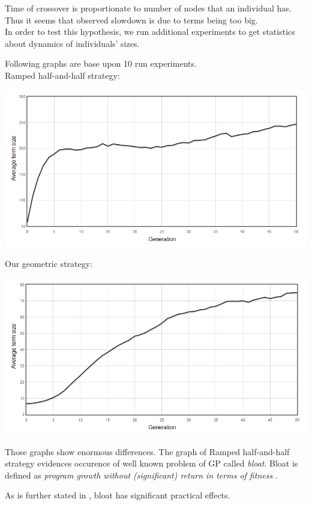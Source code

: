 \documentclass[12pt,a4paper]{report}
\begin{document}
Time of crossover is proportionate to number of nodes that 
an individual has. Thus it seems that observed slowdown is
due to terms being too big. \\

In order to test this hypothesis, we run additional experiments
to get statistics about dynamics of individuals' sizes. 

Following graphs are base upon 10 run experiments.\\ 

Ramped half-and-half strategy:

\includegraphics[scale=0.65]{reports/Ant/term-sizes-ANT-10behu-ramped.png}

Our geometric strategy:

\includegraphics[scale=0.65]{reports/Ant/term-sizes-ANT-10behu-geom.png}

Those graphs show enormous differences. 
The graph of Ramped half-and-half strategy evidences
occurence of well known problem of GP called \textit{bloat}.
Bloat is defined as \textit{program growth without (significant) return in
terms of fitness} \cite{fg}.

As is further stated in \cite{fg}, bloat has significant practical effects.
\end{document}
